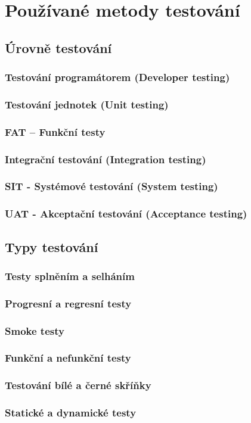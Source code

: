 \chapter{Používané metody testování}

\section{Úrovně testování}

\subsection{Testování programátorem (Developer testing)}
\subsection{Testování jednotek (Unit testing)}
\subsection{FAT – Funkční testy}
\subsection{Integrační testování (Integration testing)}
\subsection{SIT - Systémové testování (System testing)}
\subsection{UAT - Akceptační testování (Acceptance testing)}


\section{Typy testování}

\subsection{Testy splněním a selháním}
\subsection{Progresní a regresní testy}
\subsection{Smoke testy}
\subsection{Funkční a nefunkční testy}
\subsection{Testování bílé a černé skříňky}
\subsection{Statické a dynamické testy}

\endinput
